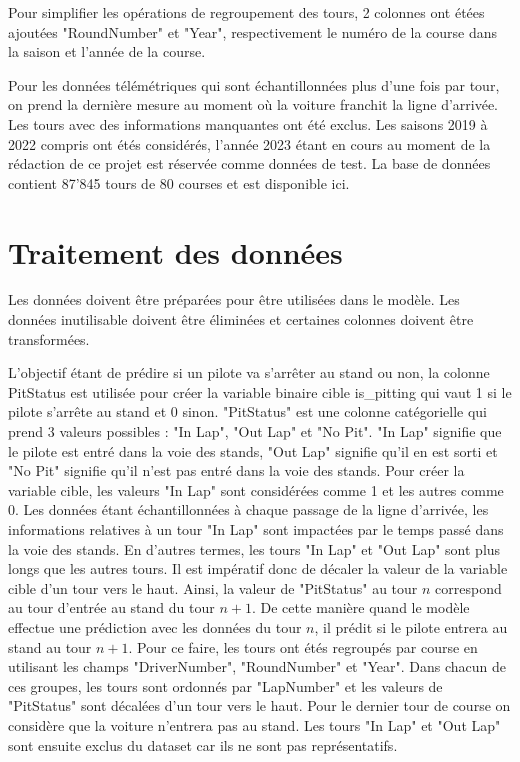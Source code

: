 Pour simplifier les opérations de regroupement des tours, 2 colonnes ont étées ajoutées "RoundNumber" et "Year", respectivement le numéro de la course dans la saison et l'année de la course.

Pour les données télémétriques qui sont échantillonnées plus d'une fois par tour,
on prend la dernière mesure au moment où la voiture franchit la ligne d'arrivée.
Les tours avec des informations manquantes ont été exclus.
Les saisons 2019 à 2022 compris ont étés considérés, l'année 2023 étant en cours au moment de la rédaction de ce projet
est réservée comme données de test. La base de données contient 87'845 tours de 80 courses et est disponible ici. %

\section{Traitement des données}
Les données doivent être préparées pour être utilisées dans le modèle. Les données inutilisable doivent être éliminées
et certaines colonnes doivent être transformées.

L'objectif étant de prédire si un pilote va s'arrêter au stand ou non, la colonne PitStatus est utilisée pour créer la variable binaire cible is\_pitting qui vaut 1 si le pilote s'arrête au stand et 0 sinon.
"PitStatus" est une colonne catégorielle qui prend 3 valeurs possibles : "In Lap", "Out Lap" et "No Pit".
"In Lap" signifie que le pilote est entré dans la voie des stands, "Out Lap" signifie qu'il en est sorti et "No Pit" signifie qu'il n'est pas entré dans la voie des stands.
Pour créer la variable cible, les valeurs "In Lap" sont considérées comme 1 et les autres comme 0.
Les données étant échantillonnées à chaque passage de la ligne d'arrivée, les informations relatives à un tour "In Lap" sont impactées par le temps passé dans la voie des stands.
En d'autres termes, les tours "In Lap" et "Out Lap" sont plus longs que les autres tours. Il est impératif donc de décaler la valeur de la variable cible d'un tour vers le haut.
Ainsi, la valeur de "PitStatus" au tour $n$ correspond au tour d'entrée au stand du tour $n+1$.
De cette manière quand le modèle effectue une prédiction avec les données du tour $n$, il prédit si le pilote entrera au stand au tour $n+1$.
Pour ce faire, les tours ont étés regroupés par course en utilisant les champs "DriverNumber", "RoundNumber" et "Year".
Dans chacun de ces groupes, les tours sont ordonnés par "LapNumber" et les valeurs de "PitStatus" sont décalées d'un tour vers le haut. Pour le dernier tour de course on considère que la voiture n'entrera pas au stand.
Les tours "In Lap" et "Out Lap" sont ensuite exclus du dataset car ils ne sont pas représentatifs.

